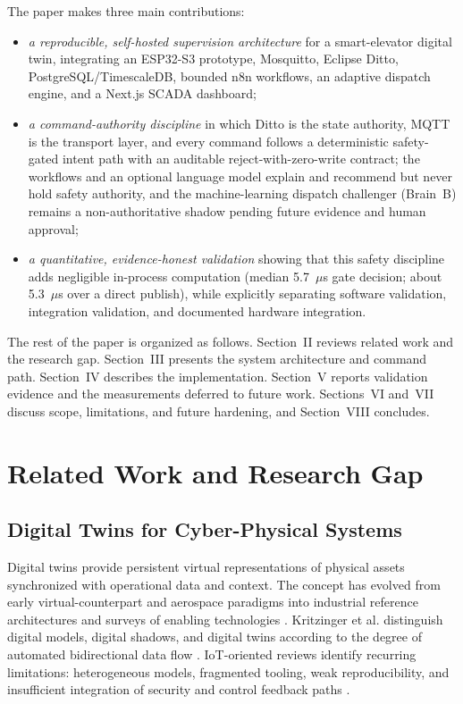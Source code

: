 \documentclass[journal]{IEEEtran}
\begin{document}
The paper makes three main contributions:
\begin{itemize}
  \item \emph{a reproducible, self-hosted supervision architecture} for a smart-elevator digital twin, integrating an ESP32-S3 prototype, Mosquitto, Eclipse Ditto, PostgreSQL/TimescaleDB, bounded n8n workflows, an adaptive dispatch engine, and a Next.js SCADA dashboard;
  \item \emph{a command-authority discipline} in which Ditto is the state authority, MQTT is the transport layer, and every command follows a deterministic safety-gated intent path with an auditable reject-with-zero-write contract; the workflows and an optional language model explain and recommend but never hold safety authority, and the machine-learning dispatch challenger (Brain~B) remains a non-authoritative shadow pending future evidence and human approval;
  \item \emph{a quantitative, evidence-honest validation} showing that this safety discipline adds negligible in-process computation (median 5.7~$\mu$s gate decision; about 5.3~$\mu$s over a direct publish), while explicitly separating software validation, integration validation, and documented hardware integration.
\end{itemize}

The rest of the paper is organized as follows. Section~II reviews related work and the research gap. Section~III presents the system architecture and command path. Section~IV describes the implementation. Section~V reports validation evidence and the measurements deferred to future work. Sections~VI and~VII discuss scope, limitations, and future hardening, and Section~VIII concludes.

\section{Related Work and Research Gap}

\subsection{Digital Twins for Cyber-Physical Systems}

Digital twins provide persistent virtual representations of physical assets synchronized with operational data and context. The concept has evolved from early virtual-counterpart and aerospace paradigms into industrial reference architectures and surveys of enabling technologies \cite{grieves2017digitalTwin,glaessgen2012digitalTwin,tao2019digitalTwin,qi2021enablingDT}. Kritzinger et al. distinguish digital models, digital shadows, and digital twins according to the degree of automated bidirectional data flow \cite{kritzinger2018digitalTwin}. IoT-oriented reviews identify recurring limitations: heterogeneous models, fragmented tooling, weak reproducibility, and insufficient integration of security and control feedback paths \cite{minerva2020digitalTwinIot,fuller2020digitalTwin}.
\end{document}
